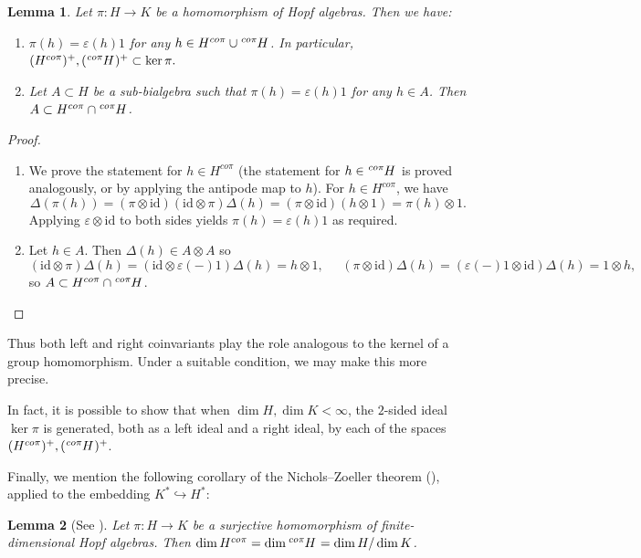 \documentclass{amsart}
\theoremstyle{plain}%
\newtheorem{lemma}{Lemma}[subsection]
\theoremstyle{remark}
\newcommand{\1}{\mathbbm{1}}
\newcommand{\id}{\mathrm{id}}
\newcommand{\prescr}[2]{\tensor*[^{#1}]{#2}{}}
\begin{document}
\begin{lemma}\label{lem:coinvar_kernel}
Let $\pi:H\to K$ be a homomorphism of Hopf algebras. Then we have:
\begin{enumerate}
    \item $\pi(h)=\varepsilon(h)1$ for any $h\in H^{co \pi}\cup \prescr{co\pi}{H}$. In particular, $ (H^{co \pi})^+, (\prescr{co\pi}{H})^+\subset  \ker \pi.$
    \item Let $A\subset H$ be a sub-bialgebra such that $\pi(h)=\varepsilon(h)1$ for any $h\in A$. Then $A\subset H^{co \pi}\cap \prescr{co\pi}{H} $.
\end{enumerate}
\end{lemma}
\begin{proof}
\mbox{}
\begin{enumerate}
    \item 
We prove the statement for $h\in H^{co \pi}$ (the statement for $h\in \prescr{co\pi}{H}$ is proved analogously, or by applying the antipode map to $h$).
For $h\in H^{co \pi}$, we have $$\Delta(\pi(h))=(\pi\otimes\id)(\mathrm{id}\otimes\pi)\Delta (h)=(\pi\otimes\id)(h\otimes 1)=\pi(h)\otimes 1.$$ Applying $\varepsilon\otimes\id$ to both sides yields $\pi(h)=\varepsilon(h)1$ as required.
    \item Let $h\in A$. Then $\Delta(h)\in A\otimes A$ so $$(\id\otimes \pi)\Delta(h) = (\id\otimes \varepsilon(-)1)\Delta (h) = h\otimes 1, \;\;\;\;\;(\pi\otimes \id)\Delta(h) = ( \varepsilon(-)1\otimes \id)\Delta (h)= 1\otimes h,$$
so $A\subset H^{co \pi}\cap \prescr{co\pi}{H} $.
\end{enumerate}
\end{proof}
Thus both left and right coinvariants play the role analogous to the kernel of a group homomorphism. Under a suitable condition, we may make this more precise.

In fact, it is possible to show that when $\dim H, \dim K<\infty$, the $2$-sided ideal $\ker \pi$ is generated, both as a left ideal and a right ideal, by each of the spaces $ (H^{co \pi})^+, (\prescr{co\pi}{H})^+$.

Finally, we mention the following corollary of the Nichols–Zoeller theorem (\cite{NZ}), applied to the embedding $K^*\hookrightarrow H^*$:
\begin{lemma}[See \cite{Sch}]\label{lem:dim_coinvar}
   Let $\pi:H\to K$ be a surjective homomorphism of finite-dimensional Hopf algebras. Then $\dim H^{co \pi}=\dim \prescr{co\pi}{H}=\dim H/\dim K$. 
\end{lemma}
 
\end{document}
